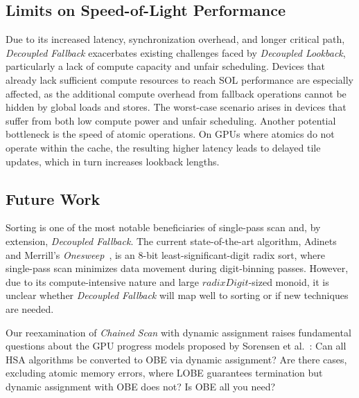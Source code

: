 \documentclass[acmsmall, manuscript, screen, review, anonymous]{acmart}
\begin{document}
\subsection{Limits on Speed-of-Light Performance}
Due to its increased latency, synchronization overhead, and longer critical path, \emph{Decoupled Fallback} exacerbates existing challenges faced by \emph{Decoupled Lookback}, particularly a lack of compute capacity and unfair scheduling. Devices that already lack sufficient compute resources to reach SOL performance are especially affected, as the additional compute overhead from fallback operations cannot be hidden by global loads and stores. The worst-case scenario arises in devices that suffer from both low compute power and unfair scheduling. Another potential bottleneck is the speed of atomic operations. On GPUs where atomics do not operate within the cache, the resulting higher latency leads to delayed tile updates, which in turn increases lookback lengths.

\subsection{Future Work}
Sorting is one of the most notable beneficiaries of single-pass scan and, by extension, \emph{Decoupled Fallback}. The current state-of-the-art algorithm, Adinets and Merrill's \emph{Onesweep}~\cite{adinets2022onesweepfastersignificantdigit}, is an 8-bit least-significant-digit radix sort, where single-pass scan minimizes data movement during digit-binning passes. However, due to its compute-intensive nature and large $radixDigit$-sized monoid, it is unclear whether \emph{Decoupled Fallback} will map well to sorting or if new techniques are needed.

Our reexamination of \emph{Chained Scan} with dynamic assignment raises fundamental questions about the GPU progress models proposed by Sorensen et al.~\cite{sorensen2021}: Can all HSA algorithms be converted to OBE via dynamic assignment? Are there cases, excluding atomic memory errors, where LOBE guarantees termination but dynamic assignment with OBE does not? Is OBE all you need?
\end{document}
